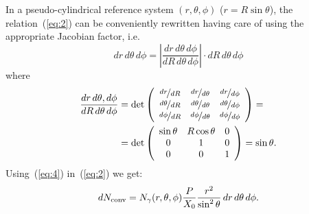In a pseudo-cylindrical
reference system $(r,\theta,\phi)$ ($r=R\sin\theta$), the relation~(\ref{eq:2}) can be
conveniently rewritten having care of using the appropriate Jacobian
factor, i.e.
\begin{equation}
 dr\, d\theta\, d\phi = \left| \frac{dr\,d\theta\,d\phi}{dR\,d\theta\,d\phi}
   \right| \cdot dR\,d\theta\,d\phi
\label{eq:3}
\end{equation}
where
\begin{equation}
\begin{split}
\frac{dr\,d\theta,d\phi}{dR\,d\theta\,d\phi}
& = \det \left( \begin{array}{ccc}
\nicefrac{dr}{dR}      & \nicefrac{dr}{d\theta}      & \nicefrac{dr}{d\phi} \\
\nicefrac{d\theta}{dR} & \nicefrac{d\theta}{d\theta} & \nicefrac{d\theta}{d\phi} \\
\nicefrac{d\phi}{dR}   & \nicefrac{d\phi}{d\theta}   & \nicefrac{d\phi}{d\phi}
\end{array} \right) =\\
& = \det \left( \begin{array}{ccc}
\sin \theta & R\cos \theta & 0\\
 0 & 1 & 0 \\
 0 & 0 & 1 
\end{array} \right)
= \sin \theta .
\end{split}
\label{eq:4}
\end{equation}
Using~(\ref{eq:4}) in~(\ref{eq:2}) we get:
\begin{equation}
dN_{\rm conv} = N_{\gamma}(r, \theta, \phi) 
\frac{P}{X_0} \frac{r^2}{\sin^2\theta} \,dr\,d\theta\,d\phi .
\label{eq:5}
\end{equation}

